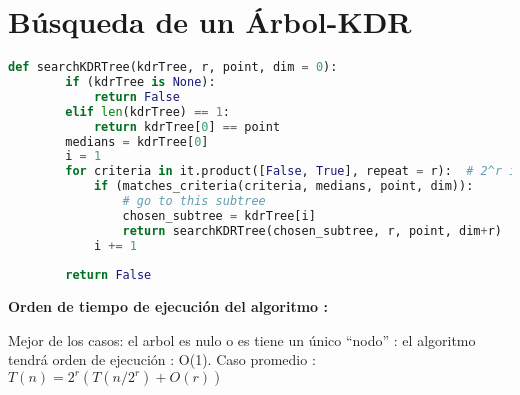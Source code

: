 	\section{Búsqueda de un Árbol-KDR}
	\begin{lstlisting}[language=Python]
	def searchKDRTree(kdrTree, r, point, dim = 0):
		if (kdrTree is None):
			return False
		elif len(kdrTree) == 1:
			return kdrTree[0] == point
		medians = kdrTree[0]
		i = 1
		for criteria in it.product([False, True], repeat = r):  # 2^r iteraciones
			if (matches_criteria(criteria, medians, point, dim)):
				# go to this subtree
				chosen_subtree = kdrTree[i]
				return searchKDRTree(chosen_subtree, r, point, dim+r)
			i += 1
	
		return False
		\end{lstlisting}
	\textbf{ Orden de tiempo de ejecución del algoritmo : }
		{Mejor de los casos: el arbol es nulo o es tiene un único ``nodo'' : 
		el algoritmo tendrá orden de ejecución : O(1).
		Caso promedio : \(T(n)= 2^r (T(n/2^r)+ O(r))\)
		
		
		
		}



